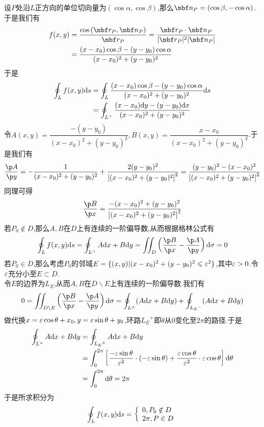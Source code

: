 \documentclass{ctexart}
\begin{document}
\begin{solution}
    设$P$处沿$L$正方向的单位切向量为$(\cos\alpha,\cos\beta)$,那么$\mbf n_P=(\cos\beta,-\cos\alpha)$.于是我们有
    \[\begin{aligned}
        f(x,y)
        &= \dfrac{\cos\left(\mbf r_P,\mbf n_P\right)}{\mbf r_P}=\dfrac{\mbf r_P\cdot\mbf n_P}{|\mbf r_P|^2|\mbf n_P|}\\
        &= \dfrac{(x-x_0)\cos\beta-(y-y_0)\cos\alpha}{(x-x_0)^2+(y-y_0)^2}
    \end{aligned}\]
    于是
    \[\begin{aligned}
        \oint_{L}f(x,y)\mathrm{d} s
        &= \oint_{L}\dfrac{(x-x_0)\cos\beta-(y-y_0)\cos\alpha}{(x-x_0)^2+(y-y_0)^2}\mathrm{d} s \\
        &= \oint_{L^+}\dfrac{(x-x_0)\mathrm{d} y-(y-y_0)\mathrm{d} x}{(x-x_0)^2+(y-y_0)^2}
    \end{aligned}\]
    令$A(x,y)=\dfrac{-(y-y_0)}{(x-x_0)^2+(y-y_0)^2},B(x,y)=\dfrac{x-x_0}{(x-x_0)^2+(y-y_0)^2}$.于是我们有
    \[\dfrac{\p A}{\p y}=-\dfrac{1}{(x-x_0)^2+(y-y_0)^2}+\dfrac{2(y-y_0)^2}{\left[(x-x_0)^2+(y-y_0)^2\right]^2}=\dfrac{(y-y_0)^2-(x-x_0)^2}{\left[(x-x_0)^2+(y-y_0)^2\right]^2}\]
    同理可得
    \[\dfrac{\p B}{\p x}=\dfrac{-(x-x_0)^2+(y-y_0)^2}{\left[(x-x_0)^2+(y-y_0)^2\right]^2}\]
    若$P_0\notin D$,那么$A,B$在$D$上有连续的一阶偏导数,从而根据格林公式有
    \[\oint_{L}f(x,y)\di s=\oint_{L^+}A\di x+B\di y=\iint_D\left(\dfrac{\p B}{\p x}-\dfrac{\p A}{\p y}\right)\di\sigma=0\]
    若$P_0\in D$,那么考虑$P_0$的邻域$E=\{(x,y)|(x-x_0)^2+(y-y_0)^2\leqslant\varepsilon^2\}$,其中$\varepsilon>0$.令$\varepsilon$充分小至$E\subset D$.\\
    令$E$的边界为$L_E$,从而$A,B$在$D\backslash E$上有连续的一阶偏导数.我们有
    \[0=\iint_{D\backslash E}\left(\dfrac{\p B}{\p x}-\dfrac{\p A}{\p y}\right)\di\sigma=\oint_{L^+}(A\di x+B\di y)+\oint_{{L_E}^-}(A\di x+B\di y)\]
    做代换$x=\varepsilon\cos\theta+x_0,y=\varepsilon\sin\theta+y_0$,环路${L_E}^+$即$\theta$从$0$变化至$2\pi$的路径.于是
    \[\begin{aligned}
        \oint_{L^+}A\mathrm{d} x+B\mathrm{d} y
        &= \oint_{{L_E}^+}A\mathrm{d} x+B\mathrm{d} y \\
        &= \int_{0}^{2\pi}\left[\dfrac{-\varepsilon\sin\theta}{\varepsilon^2}\cdot(-\varepsilon\sin\theta)+\dfrac{\varepsilon\cos\theta}{\varepsilon^2}\cdot\varepsilon\cos\theta\right]\mathrm{d}\theta \\
        &= \int_0^{2\pi}\mathrm{d}\theta=2\pi
    \end{aligned}\]
    于是所求积分为
    \[\oint_{L}f(x,y)\mathrm{d} s=\left\{\begin{array}{l}
        0,P_0\notin D\\2\pi,P\in D
    \end{array}\right.\]
\end{solution}
\end{document}
